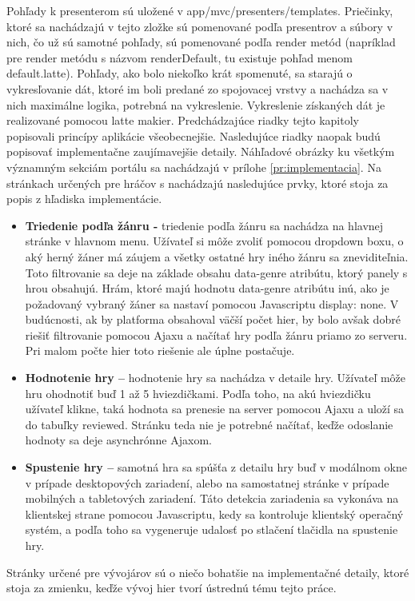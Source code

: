 Pohľady k presenterom sú uložené v app/mvc/presenters/templates. Priečinky, ktoré sa nachádzajú v tejto zložke sú pomenované podľa presentrov a súbory v nich, čo už sú samotné pohľady, sú pomenované podľa render metód (napríklad pre render metódu s názvom renderDefault, tu existuje pohľad menom default.latte). Pohľady, ako bolo niekoľko krát spomenuté, sa starajú o vykresľovanie dát, ktoré im boli predané zo spojovacej vrstvy a nachádza sa v nich maximálne logika, potrebná na vykreslenie. Vykreslenie získaných dát je realizované pomocou latte makier. 
Predchádzajúce riadky tejto kapitoly popisovali princípy aplikácie všeobecnejšie. Nasledujúce riadky naopak budú popisovať implementačne zaujímavejšie detaily. Náhľadové obrázky ku všetkým významným sekciám portálu sa nachádzajú v prílohe \ref{pr:implementacia}. Na stránkach určených pre hráčov s nachádzajú nasledujúce prvky, ktoré stoja za popis z hľadiska implementácie.
\begin{itemize}  
\item \textbf{Triedenie podľa žánru -}  triedenie podľa žánru sa nachádza na hlavnej stránke v hlavnom menu. Užívateľ si môže zvoliť pomocou dropdown boxu, o aký herný žáner má záujem a všetky ostatné hry iného žánru sa zneviditeľnia. Toto filtrovanie sa deje na základe obsahu data-genre atribútu, ktorý panely s hrou obsahujú. Hrám, ktoré majú hodnotu data-genre atribútu inú, ako je požadovaný vybraný žáner sa nastaví pomocou Javascriptu display: none. V budúcnosti, ak by platforma obsahoval väčší počet hier,  by bolo avšak dobré riešiť filtrovanie pomocou Ajaxu a načítať hry podľa žánru  priamo zo serveru. Pri malom počte hier toto riešenie ale úplne postačuje.
\item \textbf{Hodnotenie hry –} hodnotenie hry sa nachádza v detaile hry. Užívateľ môže hru ohodnotiť buď 1 až 5 hviezdičkami. Podľa toho, na akú hviezdičku užívateľ klikne, taká hodnota sa prenesie na server pomocou Ajaxu a uloží sa do tabuľky reviewed. Stránku teda nie je potrebné načítať, keďže odoslanie hodnoty sa deje asynchrónne Ajaxom.
\item \textbf{Spustenie hry –} samotná hra sa spúšťa z detailu hry buď v modálnom okne v prípade desktopových zariadení, alebo na samostatnej stránke v prípade mobilných a tabletových zariadení. Táto detekcia zariadenia sa vykonáva na klientskej strane pomocou Javascriptu, kedy sa kontroluje klientský operačný systém, a podľa toho sa vygeneruje udalosť po stlačení tlačidla na spustenie hry.
\end{itemize}
Stránky určené pre vývojárov sú o niečo bohatšie na implementačné detaily, ktoré stoja za zmienku, keďže vývoj hier tvorí ústrednú tému tejto práce.  
